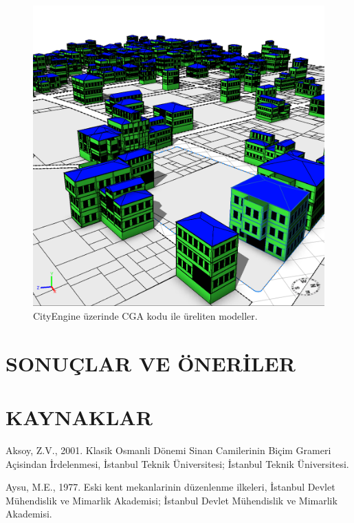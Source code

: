 \documentclass[12pt,turkish,a4paperpaper,]{report}
\begin{document}
\begin{figure}
\centering
\includegraphics[width=1\textwidth,height=\textheight]{source/figures/OrtahisarCGA.png}
\caption{CityEngine üzerinde CGA kodu ile üreliten modeller.}
\end{figure}

\newpage

\hypertarget{sonuuxe7lar-ve-uxf6neriler}{%
\chapter{SONUÇLAR VE ÖNERİLER}\label{sonuuxe7lar-ve-uxf6neriler}}

\thispagestyle{empty}

\chapter{KAYNAKLAR}

\thispagestyle{empty}

\hypertarget{refs}{}
\leavevmode\hypertarget{ref-Aksoy:2001wz}{}%
Aksoy, Z.V., 2001. Klasik Osmanli Dönemi Sinan Camilerinin Biçim Grameri
Açisindan İrdelenmesi, İstanbul Teknik Üniversitesi; İstanbul Teknik
Üniversitesi.

\leavevmode\hypertarget{ref-Aysu:1977wt}{}%
Aysu, M.E., 1977. Eski kent mekanlarinin düzenlenme ilkeleri, İstanbul
Devlet Mühendislik ve Mimarlik Akademisi; İstanbul Devlet Mühendislik ve
Mimarlik Akademisi.
\end{document}
